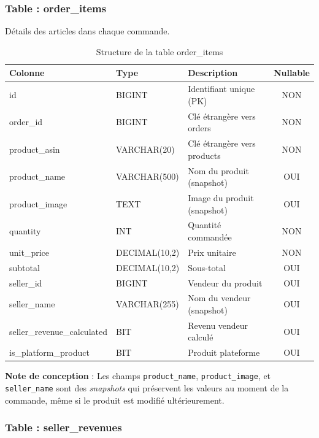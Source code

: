 \documentclass[12pt,a4paper]{report}
\begin{document}
\subsubsection{Table : order\_items}

Détails des articles dans chaque commande.

\begin{table}[H]
    \centering
    \caption{Structure de la table order\_items}
    \begin{tabularx}{\textwidth}{llXc}
        \toprule
        \textbf{Colonne} & \textbf{Type} & \textbf{Description} & \textbf{Nullable} \\
        \midrule
        id & BIGINT & Identifiant unique (PK) & NON \\
        order\_id & BIGINT & Clé étrangère vers orders & NON \\
        product\_asin & VARCHAR(20) & Clé étrangère vers products & NON \\
        product\_name & VARCHAR(500) & Nom du produit (snapshot) & OUI \\
        product\_image & TEXT & Image du produit (snapshot) & OUI \\
        quantity & INT & Quantité commandée & NON \\
        unit\_price & DECIMAL(10,2) & Prix unitaire & NON \\
        subtotal & DECIMAL(10,2) & Sous-total & OUI \\
        seller\_id & BIGINT & Vendeur du produit & OUI \\
        seller\_name & VARCHAR(255) & Nom du vendeur (snapshot) & OUI \\
        seller\_revenue\_calculated & BIT & Revenu vendeur calculé & OUI \\
        is\_platform\_product & BIT & Produit plateforme & OUI \\
        \bottomrule
    \end{tabularx}
    \label{tab:order_items}
\end{table}

\textbf{Note de conception} : Les champs \texttt{product\_name}, \texttt{product\_image}, et \texttt{seller\_name} sont des \textit{snapshots} qui préservent les valeurs au moment de la commande, même si le produit est modifié ultérieurement.

\subsubsection{Table : seller\_revenues}
\end{document}
